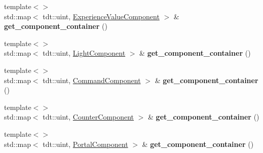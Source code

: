 \begin{DoxyCompactItemize}
\item 
{\footnotesize template$<$$>$ }\\std\+::map$<$ tdt\+::uint, \hyperlink{struct_experience_value_component}{Experience\+Value\+Component} $>$ \& {\bfseries get\+\_\+component\+\_\+container} ()\hypertarget{class_entity_system_ab56d27de7ff71878e26b4214d75af1b3}{}\label{class_entity_system_ab56d27de7ff71878e26b4214d75af1b3}

\item 
{\footnotesize template$<$$>$ }\\std\+::map$<$ tdt\+::uint, \hyperlink{struct_light_component}{Light\+Component} $>$ \& {\bfseries get\+\_\+component\+\_\+container} ()\hypertarget{class_entity_system_a55cb72f54ca005f494316df828de118a}{}\label{class_entity_system_a55cb72f54ca005f494316df828de118a}

\item 
{\footnotesize template$<$$>$ }\\std\+::map$<$ tdt\+::uint, \hyperlink{struct_command_component}{Command\+Component} $>$ \& {\bfseries get\+\_\+component\+\_\+container} ()\hypertarget{class_entity_system_a3b84416a3c422656f9daa09535b836b9}{}\label{class_entity_system_a3b84416a3c422656f9daa09535b836b9}

\item 
{\footnotesize template$<$$>$ }\\std\+::map$<$ tdt\+::uint, \hyperlink{struct_counter_component}{Counter\+Component} $>$ \& {\bfseries get\+\_\+component\+\_\+container} ()\hypertarget{class_entity_system_a8841eb6b81a9be95566ff0eebcb1121d}{}\label{class_entity_system_a8841eb6b81a9be95566ff0eebcb1121d}

\item 
{\footnotesize template$<$$>$ }\\std\+::map$<$ tdt\+::uint, \hyperlink{struct_portal_component}{Portal\+Component} $>$ \& {\bfseries get\+\_\+component\+\_\+container} ()\hypertarget{class_entity_system_a23789f4f49cd2b2ec424034efeeabe91}{}\label{class_entity_system_a23789f4f49cd2b2ec424034efeeabe91}

\end{DoxyCompactItemize}
